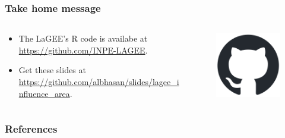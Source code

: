 \documentclass[aspectratio=169]{beamer}
\begin{document}
\begin{frame}
    \frametitle{Take home message}
    \begin{columns}
        \begin{column}{0.7\textwidth}
            \begin{itemize}
                \item The LaGEE's R code is availabe at 
                    \url{https://github.com/INPE-LAGEE}.
                \item Get these slides at 
\footnotesize{\url{https://github.com/albhasan/slides/lagee_influence_area}}.
            \end{itemize}
        \end{column}
        \begin{column}{0.3\textwidth}
            \begin{figure}
                 \includegraphics[scale=2]
                 {logos/github-mark.png}
            \end{figure}
        \end{column}
    \end{columns}
\end{frame}

\begin{frame}[allowframebreaks]
	\frametitle{References}
	\printbibliography
\end{frame}
\end{document}
